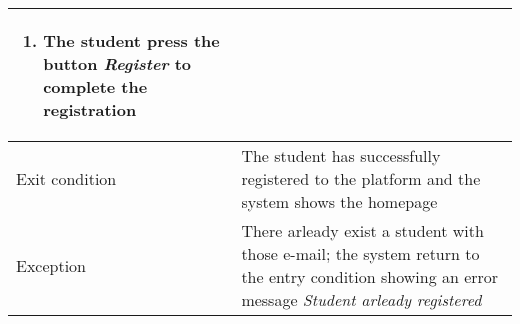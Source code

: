 \begin{table} [H]
\begin{tabular}{|| P{7.5cm} | P{7.5cm} ||}
{\begin{enumerate}[label=\alpha]
						\textit{Upload CV} to upload the 
						curriculum (the button is part of 
						the form)
						\item The student press the button 
						\textit{Register} to complete the 
						registration
						\end{enumerate}} \\
					\hline 
					Exit condition & The student has successfully registered 
					to the platform and the system shows the 
					homepage \\
					\hline
					Exception & There arleady exist a student with 
					those e-mail; the system return to 
					the entry condition showing an 
					error message \textit{Student arleady 
					registered} \\
					\hline
				\end{tabular}
			\end{table}
			
			
		

